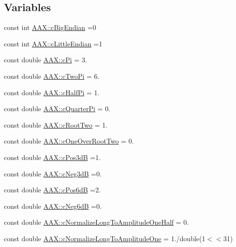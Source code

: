 \subsection*{Variables}
\begin{DoxyCompactItemize}
\item 
const int \hyperlink{a00288_af4c24d9d2042fe4252db5431ef126d00}{A\+A\+X\+::c\+Big\+Endian} =0
\item 
const int \hyperlink{a00288_af7fcadf3ad159bf29bbe5a1c494827f2}{A\+A\+X\+::c\+Little\+Endian} =1
\item 
const double \hyperlink{a00288_a8e084631426285b3771b32dd9bb0d1a0}{A\+A\+X\+::c\+Pi} = 3.
\item 
const double \hyperlink{a00288_a13d2c593bc19660c60caf48961f16361}{A\+A\+X\+::c\+Two\+Pi} = 6.
\item 
const double \hyperlink{a00288_a5496b80979f89206ab4966721ef09e07}{A\+A\+X\+::c\+Half\+Pi} = 1.
\item 
const double \hyperlink{a00288_ad4d53f57051266ed14dc1632e95cb04e}{A\+A\+X\+::c\+Quarter\+Pi} = 0.
\item 
const double \hyperlink{a00288_af5ff0caa18f36334fd5c52e97f4a0cad}{A\+A\+X\+::c\+Root\+Two} = 1.
\item 
const double \hyperlink{a00288_a0ae4975165aaf788ed120dbdd82a3cd7}{A\+A\+X\+::c\+One\+Over\+Root\+Two} = 0.
\item 
const double \hyperlink{a00288_ad25c51177cb216caae3b4747b028d8ba}{A\+A\+X\+::c\+Pos3d\+B} =1.
\item 
const double \hyperlink{a00288_af6f212fd5bb0df08db615fffe4445a3d}{A\+A\+X\+::c\+Neg3d\+B} =0.
\item 
const double \hyperlink{a00288_aade00875e4e88b00d991197f574c42ed}{A\+A\+X\+::c\+Pos6d\+B} =2.
\item 
const double \hyperlink{a00288_aca5925abc898233b406504d92ee9ef4c}{A\+A\+X\+::c\+Neg6d\+B} =0.
\item 
const double \hyperlink{a00288_a93ce2d3935dc06b1c4c887568df84788}{A\+A\+X\+::c\+Normalize\+Long\+To\+Amplitude\+One\+Half} = 0.
\item 
const double \hyperlink{a00288_ad30333177ff94148492a02325045a827}{A\+A\+X\+::c\+Normalize\+Long\+To\+Amplitude\+One} = 1./double(1$<$$<$31)
$$
\end{DoxyCompactItemize}
